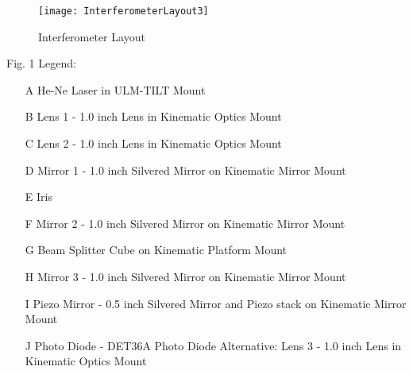 \begin{figure}[ht]
\centering
\texttt{[image: InterferometerLayout3]}
\caption{Interferometer Layout}
\label{fig:interferometer}
\end{figure}
\newpage
Fig. 1 Legend:
\begin{enumerate} \itemsep1pt \parskip0pt 
   \item[A] He-Ne Laser in ULM-TILT Mount
   \item[B] Lens 1 - 1.0 inch Lens in Kinematic Optics Mount
   \item[C] Lens 2 - 1.0 inch Lens in Kinematic Optics Mount
   \item[D] Mirror 1 - 1.0 inch Silvered Mirror on Kinematic Mirror Mount
   \item[E] Iris
   \item[F] Mirror 2 - 1.0 inch Silvered Mirror on Kinematic Mirror Mount
   \item[G] Beam Splitter Cube on Kinematic Platform Mount
   \item[H] Mirror 3 - 1.0 inch Silvered Mirror on Kinematic Mirror Mount
   \item[I] Piezo Mirror - 0.5 inch Silvered Mirror and Piezo stack on Kinematic Mirror Mount
   \item[J] Photo Diode - DET36A Photo Diode
    Alternative: Lens 3 - 1.0 inch Lens in Kinematic Optics Mount
\end{enumerate}
